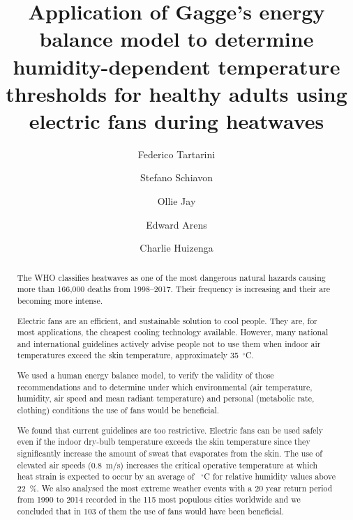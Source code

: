 
\begin{frontmatter}

\title{Application of Gagge's energy balance model to determine humidity-dependent temperature thresholds for healthy adults using electric fans during heatwaves}

\author[sinBerBest]{Federico Tartarini}
\author[CBE]{Stefano Schiavon}
\author[USYD]{Ollie Jay}
\author[CBE]{Edward Arens}
\author[CBE]{Charlie Huizenga}

\address[sinBerBest]{SinBerBEST, Berkeley Education Alliance for Research in Singapore, Singapore}
\address[CBE]{Center for the Built Environment, University of California, Berkeley, USA}
\address[USYD]{Sydney School of Health Sciences, Faculty of Medicine and Health, The University of Sydney, Sydney, Australia}

\begin{abstract}
    The WHO classifies heatwaves as one of the most dangerous natural hazards causing more than 166,000 deaths from 1998--2017.
    Their frequency is increasing and their are becoming more intense.
    
    Electric fans are an efficient, and sustainable solution to cool people.
    They are, for most applications, the cheapest cooling technology available.
    However, many national and international guidelines actively advise people not to use them when indoor air temperatures exceed the skin temperature, approximately 35~$^{\circ}$C\@.
    
    We used a human energy balance model, to verify the validity of those recommendations and to determine under which environmental (air temperature, humidity, air speed and mean radiant temperature) and personal (metabolic rate, clothing) conditions the use of fans would be beneficial.
    
    We found that current guidelines are too restrictive.
    Electric fans can be used safely even if the indoor dry-bulb temperature exceeds the skin temperature since they significantly increase the amount of sweat that evaporates from the skin.
    The use of elevated air speeds (0.8~m/s) increases the critical operative temperature at which heat strain is expected to occur by an average of ~$^{\circ}$C for relative humidity values above 22~\%\@.
    We also analysed the most extreme weather events with a 20 year return period from 1990 to 2014 recorded in the 115 most populous cities worldwide and we concluded that in 103 of them the use of fans would have been beneficial.
    

\end{abstract}
\end{frontmatter}
